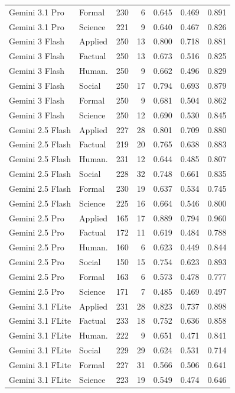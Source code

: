 \begin{longtable}{llrrrrr}
Gemini 3.1 Pro & Formal & 230 & 6 & 0.645 & 0.469 & 0.891 \\
Gemini 3.1 Pro & Science & 221 & 9 & 0.640 & 0.467 & 0.826 \\
Gemini 3 Flash & Applied & 250 & 13 & 0.800 & 0.718 & 0.881 \\
Gemini 3 Flash & Factual & 250 & 13 & 0.673 & 0.516 & 0.825 \\
Gemini 3 Flash & Human. & 250 & 9 & 0.662 & 0.496 & 0.829 \\
Gemini 3 Flash & Social & 250 & 17 & 0.794 & 0.693 & 0.879 \\
Gemini 3 Flash & Formal & 250 & 9 & 0.681 & 0.504 & 0.862 \\
Gemini 3 Flash & Science & 250 & 12 & 0.690 & 0.530 & 0.845 \\
Gemini 2.5 Flash & Applied & 227 & 28 & 0.801 & 0.709 & 0.880 \\
Gemini 2.5 Flash & Factual & 219 & 20 & 0.765 & 0.638 & 0.883 \\
Gemini 2.5 Flash & Human. & 231 & 12 & 0.644 & 0.485 & 0.807 \\
Gemini 2.5 Flash & Social & 228 & 32 & 0.748 & 0.661 & 0.835 \\
Gemini 2.5 Flash & Formal & 230 & 19 & 0.637 & 0.534 & 0.745 \\
Gemini 2.5 Flash & Science & 225 & 16 & 0.664 & 0.546 & 0.800 \\
Gemini 2.5 Pro & Applied & 165 & 17 & 0.889 & 0.794 & 0.960 \\
Gemini 2.5 Pro & Factual & 172 & 11 & 0.619 & 0.484 & 0.788 \\
Gemini 2.5 Pro & Human. & 160 & 6 & 0.623 & 0.449 & 0.844 \\
Gemini 2.5 Pro & Social & 150 & 15 & 0.754 & 0.623 & 0.893 \\
Gemini 2.5 Pro & Formal & 163 & 6 & 0.573 & 0.478 & 0.777 \\
Gemini 2.5 Pro & Science & 171 & 7 & 0.485 & 0.469 & 0.497 \\
Gemini 3.1 FLite & Applied & 231 & 28 & 0.823 & 0.737 & 0.898 \\
Gemini 3.1 FLite & Factual & 233 & 18 & 0.752 & 0.636 & 0.858 \\
Gemini 3.1 FLite & Human. & 222 & 9 & 0.651 & 0.471 & 0.841 \\
Gemini 3.1 FLite & Social & 229 & 29 & 0.624 & 0.531 & 0.714 \\
Gemini 3.1 FLite & Formal & 227 & 31 & 0.566 & 0.506 & 0.641 \\
Gemini 3.1 FLite & Science & 223 & 19 & 0.549 & 0.474 & 0.646 \\

\end{longtable}
